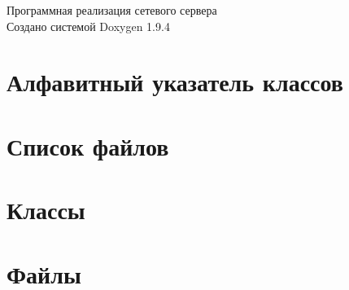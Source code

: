 \documentclass[twoside]{book}
\newcommand{\+}{\discretionary{\mbox{\scriptsize$\hookleftarrow$}}{}{}}
\newcommand{\clearemptydoublepage}{%
    \newpage{\pagestyle{empty}\cleardoublepage}%
  }
\begin{document}
  \raggedbottom
    \hypersetup{pageanchor=false,
                bookmarksnumbered=true,
                pdfencoding=unicode
               }
  \begin{titlepage}
  \vspace*{7cm}
  \begin{center}%
  {\Large Программная реализация сетевого сервера}\\
  \vspace*{1cm}
  {\large Создано системой Doxygen 1.9.4}\\
  \end{center}
  \end{titlepage}
  \clearemptydoublepage
  \tableofcontents
  \clearemptydoublepage
  \hypersetup{pageanchor=true}
\chapter{Алфавитный указатель классов}

\chapter{Список файлов}

\chapter{Классы}








\chapter{Файлы}






























  \backmatter
  \newpage
  \clearemptydoublepage
  \printindex
\end{document}
